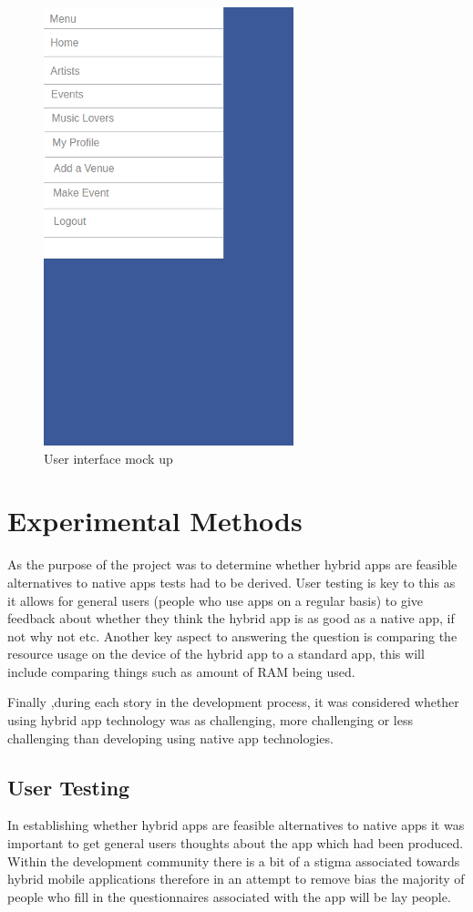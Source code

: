\begin{figure}[H]
\includegraphics[scale=0.5]{images/ui3}
\caption{User interface mock up}
\end{figure}

\section{Experimental Methods}
As the purpose of the project was to determine whether hybrid apps are feasible alternatives to native apps tests had to be derived. User testing is key to this as it allows for general users (people who use apps on a regular basis) to give feedback about whether they think the hybrid app is as good as a native app, if not why not etc. Another key aspect to answering the question is comparing the resource usage on the device of the hybrid app to a standard app, this will include comparing things such as amount of RAM being used.

Finally ,during each story in the development process, it was considered whether using hybrid app technology was as challenging, more challenging or less challenging than developing using native app technologies.

\subsection{User Testing}
In establishing whether hybrid apps are feasible alternatives to native apps it was important to get general users thoughts about the app which had been produced. Within the development community there is a bit of a stigma associated towards hybrid mobile applications therefore in an attempt to remove bias the majority of people who fill in the questionnaires associated with the app will be lay people.

